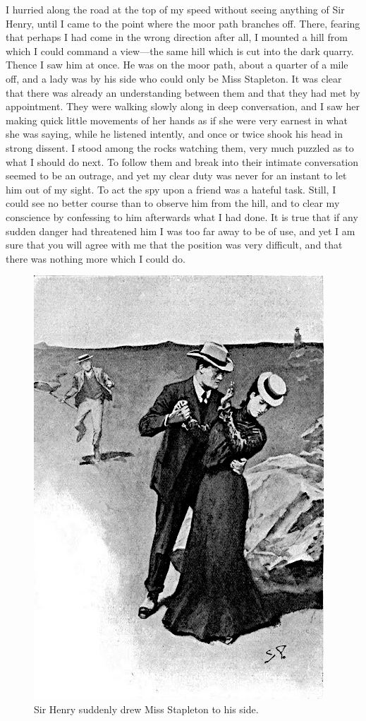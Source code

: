 \documentclass[paper=5.5in:8.5in,BCOR=7mm,twoside,DIV=calc,12pt,usegeometry,openany,chapterprefix,endperiod,headings=big]{scrbook} %
\begin{document}
I hurried along the road at the top of my speed without seeing anything of Sir Henry, until I came to the point where the moor path branches off. There, fearing that perhaps I had come in the wrong direction after all, I mounted a hill from which I could command a view---the same hill which is cut into the dark quarry. Thence I saw him at once. He was on the moor path, about a quarter of a mile off, and a lady was by his side who could only be Miss Stapleton. It was clear that there was already an understanding between them and that they had met by appointment. They were walking slowly along in deep conversation, and I saw her making quick little movements of her hands as if she were very earnest in what she was saying, while he listened intently, and once or twice shook his head in strong dissent. I stood among the rocks watching them, very much puzzled as to what I should do next. To follow them and break into their intimate conversation seemed to be an outrage, and yet my clear duty was never for an instant to let him out of my sight. To act the spy upon a friend was a hateful task. Still, I could see no better course than to observe him from the hill, and to clear my conscience by confessing to him afterwards what I had done. It is true that if any sudden danger had threatened him I was too far away to be of use, and yet I am sure that you will agree with me that the position was very difficult, and that there was nothing more which I could do.

\begin{figure}[tbh]
\centering
\includegraphics[width=.7\linewidth]{09_drewmiss}
\caption{Sir Henry suddenly drew Miss Stapleton to his side.}
\end{figure}
\end{document}

